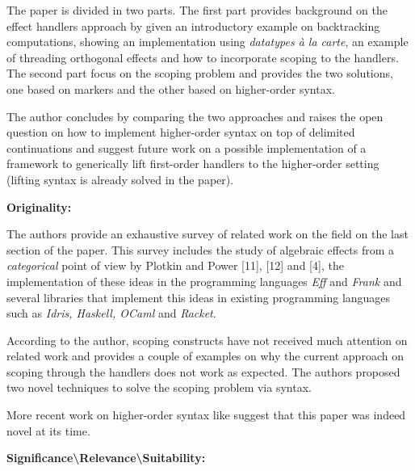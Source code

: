 \documentclass[12pt, a4paper]{article}
\begin{document}
The paper is divided in two parts. The first part provides background on the effect handlers approach by given an introductory example on backtracking computations, showing an implementation using \textit{datatypes \`a la carte}, an example of threading orthogonal effects and how to incorporate scoping to the handlers. The second part focus on the scoping problem and provides the two solutions, one based on markers and the other based on higher-order syntax.

The author concludes by comparing the two approaches and raises the open question on how to implement higher-order syntax on top of delimited continuations and suggest future work on a possible implementation of a framework to generically lift first-order handlers to the higher-order setting (lifting syntax is already solved in the paper).


\vspace{2ex}
{\normalsize \textbf{Originality:}}

The authors provide an exhaustive survey of related work on the field on the last section of the paper.
This survey includes the study of algebraic effects from a \textit{categorical} point of view by Plotkin and Power [11], [12] and [4], the implementation of these ideas in the programming languages \textit{Eff} and \textit{Frank} and several libraries that implement this ideas in existing programming languages such as \textit{Idris, Haskell, OCaml} and \textit{Racket}.

According to the author, scoping constructs have not received much attention on related work and provides a couple of examples on why the current approach on scoping through the handlers does not work as expected. The authors proposed two novel techniques to solve the scoping problem via syntax.

More recent work on higher-order syntax like \cite{mpc2015} suggest that this paper was indeed novel at its time.


\vspace{2ex}
{\normalsize \textbf{Significance\textbackslash Relevance\textbackslash Suitability:}}
\end{document}
